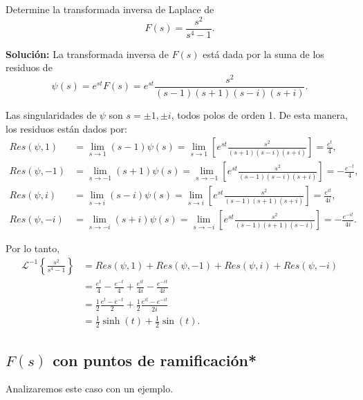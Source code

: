 \begin{ejemplo}
    Determine la transformada inversa de Laplace de 
    $$F(s) = \frac{s^2}{s^4-1}.$$

    \textbf{Solución:} La transformada inversa de $F(s)$ está dada por la suma de los residuos de
    $$\psi(s) = e^{st} F(s) = e^{st} \frac{s^2}{(s-1)(s+1)(s-i)(s+i)}.$$

    Las singularidades de $\psi$ son $s = \pm 1, \pm i$, todos polos de orden 1. De esta manera, los residuos están dados por:
    \begin{align*}
        Res(\psi, 1) &= \lim_{s \to 1} (s-1) \psi(s) = \lim_{s\to 1} \left[e^{st} \frac{s^2}{(s+1)(s-i)(s+i)} \right] = \frac{e^t}{4},\\
        Res(\psi, -1) &= \lim_{s \to -1} (s+1) \psi(s) = \lim_{s\to -1} \left[e^{st} \frac{s^2}{(s-1)(s-i)(s+i)} \right] = -\frac{e^{-t}}{4}, \\
        Res(\psi, i) &= \lim_{s \to i} (s-i) \psi(s) = \lim_{s\to i} \left[e^{st} \frac{s^2}{(s-1)(s+1)(s+i)} \right] = \frac{e^{it}}{4i}, \\
        Res(\psi, -i) &= \lim_{s \to -i} (s+i) \psi(s) = \lim_{s\to -i} \left[e^{st} \frac{s^2}{(s-1)(s+1)(s-i)} \right] = -\frac{e^{-it}}{4i}.
    \end{align*}

    Por lo tanto,
    \begin{align*}
        \mathcal{L}^{-1} \left\{\frac{s^2}{s^4-1} \right\} &= Res(\psi,1) + Res(\psi,-1) + Res(\psi,i) + Res(\psi, -i) \\
        &= \frac{e^t}{4} - \frac{e^{-t}}{4} + \frac{e^{it}}{4i} - \frac{e^{-it}}{4i} \\
        &= \frac{1}{2} \frac{e^t - e^{-t}}{2} + \frac{1}{2} \frac{e^{it} - e^{-it}}{2i} \\
        &= \frac{1}{2} \sinh(t) + \frac{1}{2} \sin(t).
    \end{align*}
\end{ejemplo}

\subsection{\texorpdfstring{$F(s)$}{TEXT} con puntos de ramificación*}

Analizaremos este caso con un ejemplo.

